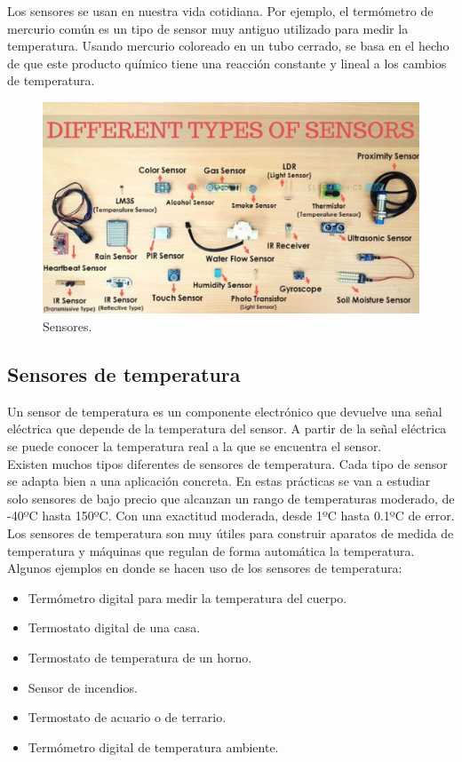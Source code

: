 \documentclass[12pt]{book}
\begin{document}
Los sensores se usan en nuestra vida cotidiana. Por ejemplo, el termómetro de mercurio común es un tipo de sensor muy antiguo utilizado para medir la temperatura. Usando mercurio coloreado en un tubo cerrado, se basa en el hecho de que este producto químico tiene una reacción constante y lineal a los cambios de temperatura. \\

\begin{figure}[h]
	\centering
	\includegraphics[width=0.6\linewidth]{imagenes/sensores}
	\caption[Sensores]{Sensores.}
	\label{fig:sensores}
\end{figure}

\vspace{4cm}


\subsection{Sensores de temperatura}

Un sensor de temperatura es un componente electrónico que devuelve una señal eléctrica que depende de la temperatura del sensor. A partir de la señal eléctrica se puede conocer la temperatura real a la que se encuentra el sensor. \\
Existen muchos tipos diferentes de sensores de temperatura. Cada tipo de sensor se adapta bien a una aplicación concreta. En estas prácticas se van a estudiar solo sensores de bajo precio que alcanzan un rango de temperaturas moderado, de -40ºC hasta 150ºC. Con una exactitud moderada, desde 1ºC hasta 0.1ºC de error. Los sensores de temperatura son muy útiles para construir aparatos de medida de temperatura y máquinas que regulan de forma automática la temperatura. \\

Algunos ejemplos en donde se hacen uso de los sensores de temperatura:
\begin{itemize}
	\item Termómetro digital para medir la temperatura del cuerpo.
	\item Termostato digital de una casa.
	\item Termostato de temperatura de un horno.
	\item Sensor de incendios.
	\item Termostato de acuario o de terrario.
	\item Termómetro digital de temperatura ambiente.
\end{itemize}
\end{document}
